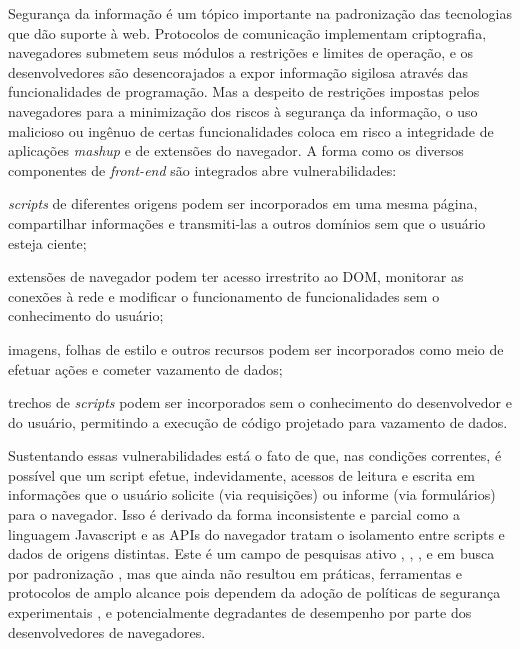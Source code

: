 
Segurança da informação é um tópico importante na padronização das tecnologias que dão suporte à web. Protocolos de comunicação implementam criptografia, navegadores submetem seus módulos a restrições e limites de operação, e os desenvolvedores são desencorajados a expor informação sigilosa através das funcionalidades de programação. Mas a despeito de restrições impostas pelos navegadores para a minimização dos riscos à segurança da informação, o uso malicioso ou ingênuo de certas funcionalidades coloca em risco a integridade de aplicações \textit{mashup} e de extensões do navegador. A forma como os diversos componentes de \textit{front-end} são integrados abre vulnerabilidades:

\begin{alineas}
	\item \textit{scripts} de diferentes origens podem ser incorporados em uma mesma página, compartilhar informações e transmiti-las a outros domínios sem que o usuário esteja ciente;
	\item extensões de navegador podem ter acesso irrestrito ao DOM, monitorar as conexões à rede e modificar o funcionamento de funcionalidades sem o conhecimento do usuário;
	\item imagens, folhas de estilo e outros recursos podem ser incorporados como meio de efetuar ações e cometer vazamento de dados;
	\item trechos de \textit{scripts} podem ser incorporados sem o conhecimento do desenvolvedor e do usuário, permitindo a execução de código projetado para vazamento de dados.
\end{alineas}

Sustentando essas vulnerabilidades está o fato de que, nas condições correntes, é possível que um script efetue, indevidamente, acessos de leitura e escrita em informações que o usuário solicite (via requisições) ou informe (via formulários) para o navegador. Isso é derivado da forma inconsistente e parcial como a linguagem Javascript e as APIs do navegador tratam o isolamento entre scripts e dados de origens distintas. Este é um campo de pesquisas ativo \cite{Stefan2014}, \cite{Hedin2014}, \cite{Bichhawat2014}, \cite{Magazinius2014} e em busca por padronização \cite{W3C:WebAppSec}, mas que ainda não resultou em práticas, ferramentas e protocolos de amplo alcance pois dependem da adoção de políticas de segurança experimentais \cite{Hedin2014}, \cite{Bichhawat2014} e potencialmente degradantes de desempenho \cite[p. 14]{Stefan2014} por parte dos desenvolvedores de navegadores.

